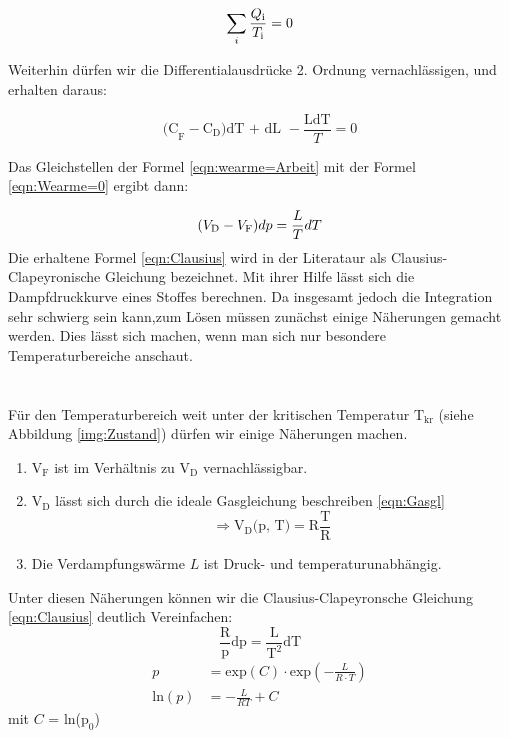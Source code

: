 \begin{equation}
    \sum_{i}\frac{Q_\text{i}}{T_\text{i}}=0\nonumber\\
    \label{eqn:sum1}
\end{equation}

Weiterhin dürfen wir die Differentialausdrücke 2. Ordnung vernachlässigen, und erhalten daraus:

\begin{equation}
    \text{(C}_\text{F} - \text{C}_\text{D}\text{)dT + dL }-\frac{\text{LdT}}{T}= 0
    \label{eqn:Wearme=0}
\end{equation}

Das Gleichstellen der Formel \eqref{eqn:wearme=Arbeit} mit der Formel \eqref{eqn:Wearme=0} ergibt dann:

\begin{equation}
    (V_\text{D}-V_\text{F})dp =\frac{L}{T}dT\\
    \label{eqn:Clausius}
\end{equation}
Die erhaltene Formel \eqref{eqn:Clausius} wird in der Literataur als Clausius-Clapeyronische Gleichung bezeichnet. Mit ihrer Hilfe 
lässt sich die Dampfdruckkurve eines Stoffes berechnen. Da insgesamt jedoch die Integration sehr schwierg sein kann,zum Lösen müssen 
zunächst einige Näherungen gemacht werden. Dies lässt sich machen, wenn man sich nur besondere Temperaturbereiche anschaut.
\\
\\
\\
Für den Temperaturbereich weit unter der kritischen Temperatur $\text{T}_\text{kr}$ (siehe Abbildung \ref{img:Zustand}) dürfen wir einige Näherungen machen.
\begin{enumerate}
    \item $\text{V}_\text{F}$ ist im Verhältnis zu $\text{V}_\text{D}$ vernachlässigbar.
    \item $\text{V}_\text{D}$ lässt sich durch die ideale Gasgleichung beschreiben \eqref{eqn:Gasgl}\\
            \begin{equation}
                \Rightarrow \text{V}_\text{D} \text{(p, T)} = \text{R}\frac{\text{T}}{\text{R}}
            \end{equation}
    \item Die Verdampfungswärme $L$ ist Druck- und temperaturunabhängig.
\end{enumerate}
Unter diesen Näherungen können wir die Clausius-Clapeyronsche Gleichung \eqref{eqn:Clausius} deutlich Vereinfachen:
\begin{equation}
    \frac{\text{R}}{\text{p}}\text{dp} = \frac{\text{L}}{\text{T}^2}\text{dT}
\end{equation}
\begin{align}
p &= \text{exp}(C)\cdot \text{exp}\left(-\frac{L}{R \cdot T}\right)\\
\text{ln}(p)&= -\frac{L}{RT} + C
\end{align}
mit $C$ = ln($\text{p}_0$)
